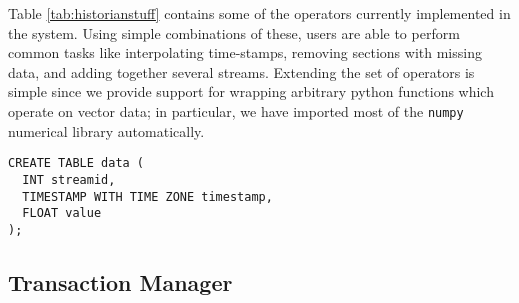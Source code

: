 Table \ref{tab:historianstuff} contains some of the operators currently implemented in the system.  Using simple combinations of these, users are able to perform common tasks like interpolating time-stamps, removing sections with missing data, and adding together several streams.  Extending the set of operators is simple since we provide support for wrapping arbitrary python functions which operate on vector data; in particular, we have imported most of the {\tt numpy} numerical library automatically.


\lstset{language=SQL}
\begin{lstlisting}
CREATE TABLE data (
  INT streamid,
  TIMESTAMP WITH TIME ZONE timestamp,
  FLOAT value
);

\end{lstlisting}
\subsection{Transaction Manager}

